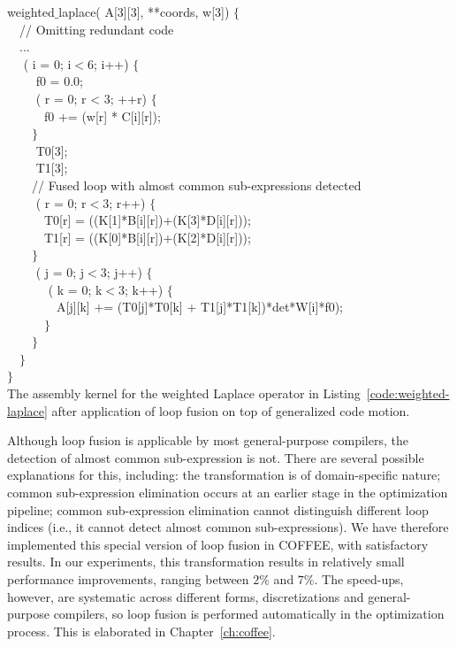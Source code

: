 \begin{algorithm}
\scriptsize\ttfamily
{}
 weighted$\_$laplace( A[3][3],  **coords,  w[3]) $\lbrace$\\
~~// Omitting redundant code \\
~~...\\
~~ ( i = 0; i$<$6; i++) $\lbrace$ \\
~~~~ f0  = 0.0;\\
~~~~ ( r  = 0; r < 3; ++r) $\lbrace$ \\
~~~~~~f0 += (w[r] * C[i][r]);\\
~~~~$\rbrace$ \\
~~~~ T0[3];\\
~~~~ T1[3];\\
~~~~// Fused loop with almost common sub-expressions detected\\
~~~~ ( r = 0; r$<$3; r++) $\lbrace$ \\
~~~~~~T0[r] = ((K[1]*B[i][r])+(K[3]*D[i][r]));\\
~~~~~~T1[r] = ((K[0]*B[i][r])+(K[2]*D[i][r]));\\
~~~~$\rbrace$\\
~~~~ ( j = 0; j$<$3; j++) $\lbrace$\\
~~~~~~ ( k = 0; k$<$3; k++) $\lbrace$\\
~~~~~~~~A[j][k] += (T0[j]*T0[k] + T1[j]*T1[k])*det*W[i]*f0);\\
~~~~~~$\rbrace$\\
~~~~$\rbrace$\\
~~$\rbrace$\\
$\rbrace$\\
\caption{The assembly kernel for the weighted Laplace operator in Listing~\ref{code:weighted-laplace} after application of loop fusion on top of generalized code motion.}
\label{code:weighted-laplace-loopfusion}
\end{algorithm}

Although loop fusion is applicable by most general-purpose compilers, the detection of almost common sub-expression is not. There are several possible explanations for this, including: the transformation is of domain-specific nature; common sub-expression elimination occurs at an earlier stage in the optimization pipeline; common sub-expression elimination cannot distinguish different loop indices (i.e., it cannot detect almost common sub-expressions). We have therefore implemented this special version of loop fusion in COFFEE, with satisfactory results. In our experiments, this transformation results in relatively small performance improvements, ranging between $2\%$ and $7\%$. The speed-ups, however, are systematic across different forms, discretizations and general-purpose compilers, so loop fusion is performed automatically in the optimization process. This is elaborated in Chapter~\ref{ch:coffee}.

